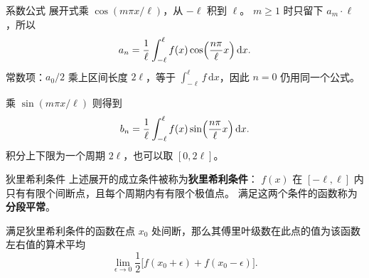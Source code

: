 \documentclass[fontset=windows, chinese, 10pt, xcolor=dvipsnames]{beamer}
\begin{document}
\begin{frame}{系数公式}
  展开式乘 $\cos(m\pi x/\ell)$，从 $-\ell$ 积到 $\ell$。
  $m\geq 1$ 时只留下 $a_m\cdot\ell$，所以
  \begin{equation*}
    a_n=\frac{1}{\ell}\int_{-\ell}^{\ell}
      f(x)\cos\Bigl(\frac{n\pi}{\ell}x\Bigr)\,\mathrm{d}x.
  \end{equation*}
  常数项：$a_0/2$ 乘上区间长度 $2\ell$，等于 $\displaystyle\int_{-\ell}^{\ell} f\,\mathrm{d}x$，因此 $n=0$ 仍用同一个公式。
  \vspace{0.3em}

  乘 $\sin(m\pi x/\ell)$ 则得到
  \begin{equation*}
    b_n=\frac{1}{\ell}\int_{-\ell}^{\ell}
      f(x)\sin\Bigl(\frac{n\pi}{\ell}x\Bigr)\,\mathrm{d}x.
  \end{equation*}
  积分上下限为一个周期 $2\ell$，也可以取 $[0,2\ell]$。
\end{frame}

\begin{frame}{狄里希利条件}
  上述展开的成立条件被称为\textbf{狄里希利条件}：
  $f(x)$ 在 $[-\ell,\ell]$ 内只有有限个间断点，且每个周期内有有限个极值点。
  满足这两个条件的函数称为\textbf{分段平常}。
  \vspace{0.5em}

  满足狄里希利条件的函数在点 $x_0$ 处间断，那么其傅里叶级数在此点的值为该函数左右值的算术平均
  \begin{equation*}
    \lim_{\epsilon\to 0}\frac12
      \bigl[f(x_0+\epsilon)+f(x_0-\epsilon)\bigr].
  \end{equation*}
\end{frame}
\end{document}
